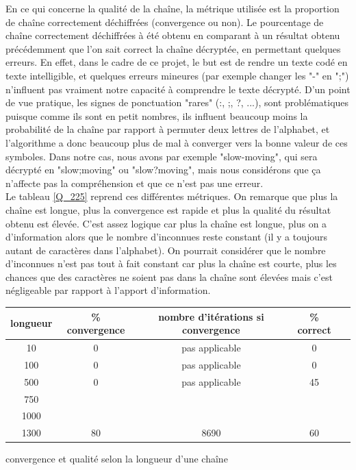 \documentclass[11pt]{report}
\begin{document}
En ce qui concerne la qualité de la chaîne, la métrique utilisée est la proportion de chaîne correctement déchiffrées (convergence ou non). Le pourcentage de chaîne correctement déchiffrées à été obtenu en comparant à un résultat obtenu précédemment que l'on sait correct la chaîne décryptée, en permettant quelques erreurs. En effet, dans le cadre de ce projet, le but est de rendre un texte codé en texte intelligible, et quelques erreurs mineures (par exemple changer les "-" en ";") n'influent pas vraiment notre capacité à comprendre le texte décrypté.
D'un point de vue pratique, les signes de ponctuation "rares" (:, ;, ?, ...), sont problématiques puisque comme ils sont en petit nombres, ils influent beaucoup moins la probabilité de la chaîne par rapport à permuter deux lettres de l'alphabet, et l'algorithme a donc beaucoup plus de mal à converger vers la bonne valeur de ces symboles. Dans notre cas, nous avons par exemple "slow-moving", qui sera décrypté en "slow;moving" ou "slow?moving", mais nous considérons que ça n'affecte pas la compréhension et que ce n'est pas une erreur.\\
Le tableau \ref{Q_225} reprend ces différentes métriques. On remarque que plus la chaîne est longue, plus la convergence est rapide et plus la qualité du résultat obtenu est élevée. C'est assez logique car plus la chaîne est longue, plus on a d'information alors que le nombre d'inconnues reste constant (il y a toujours autant de caractères dans l'alphabet). On pourrait considérer que le nombre d'inconnues n'est pas tout à fait constant car plus la chaîne est courte, plus les chances que des caractères ne soient pas dans la chaîne sont élevées mais c'est négligeable par rapport à l'apport d'information.

\begin{center}
\begin{threeparttable}
\begin{tabular}{|c|c|c|c|c|}
\hline
longueur & \% convergence & nombre d'itérations si convergence & \% correct \\
\hline
10 & 0 & pas applicable & 0 \\
\hline
100 & 0 & pas applicable & 0 \\
\hline
500 & 0 & pas applicable & 45 \\
\hline
750 \\
\hline
1000 \\
\hline
1300 & 80 & 8690 & 60 \\
\hline
\end{tabular}
\caption{\label{Q_225} convergence et qualité selon la longueur d'une chaîne}
\end{threeparttable}
\end{center}
\end{document}
